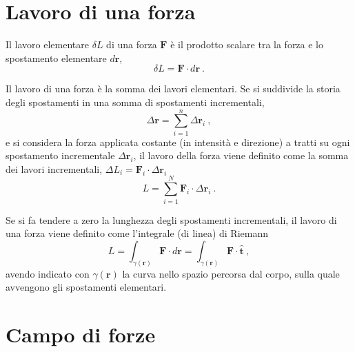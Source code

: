 \section{Lavoro di una forza}
\begin{definition} Il lavoro elementare $\delta L$ di una forza $\mathbf{F}$ è il prodotto scalare tra la forza e lo spostamento elementare $d \mathbf{r}$,
    \begin{equation}
        \delta L = \mathbf{F} \cdot d \mathbf{r} \ .
    \end{equation}
\end{definition}
Il lavoro di una forza è la somma dei lavori elementari. Se si suddivide la storia degli spostamenti in una somma di spostamenti incrementali,
\begin{equation}
  \Delta \mathbf{r} = \sum_{i=1}^{n} \Delta \mathbf{r}_i \ ,
\end{equation}
e si considera la forza applicata costante (in intensità e direzione) a tratti su ogni spostamento incrementale $\Delta \mathbf{r}_i$, il lavoro della forza viene definito come la somma dei lavori incrementali, $\Delta L_i = \mathbf{F}_i \cdot \Delta \mathbf{r}_i$
\begin{equation}
  L = \sum_{i=1}^{N} \mathbf{F}_i \cdot \Delta \mathbf{r}_i \ .
\end{equation}
\begin{definition}
Se si fa tendere a zero la lunghezza degli spostamenti incrementali, il lavoro di una forza viene definito come l'integrale (di linea) di Riemann
\begin{equation}
    L = \int_{\gamma(\mathbf{r})} \mathbf{F} \cdot d \mathbf{r} =  \int_{\gamma(\mathbf{r})} \mathbf{F} \cdot \mathbf{\hat{t}} \ ,
\end{equation}
avendo indicato con $\gamma(\mathbf{r})$ la curva nello spazio percorsa dal corpo, sulla quale avvengono gli spostamenti elementari.
\end{definition}

\section{Campo di forze}
\begin{definition}
\end{definition}

